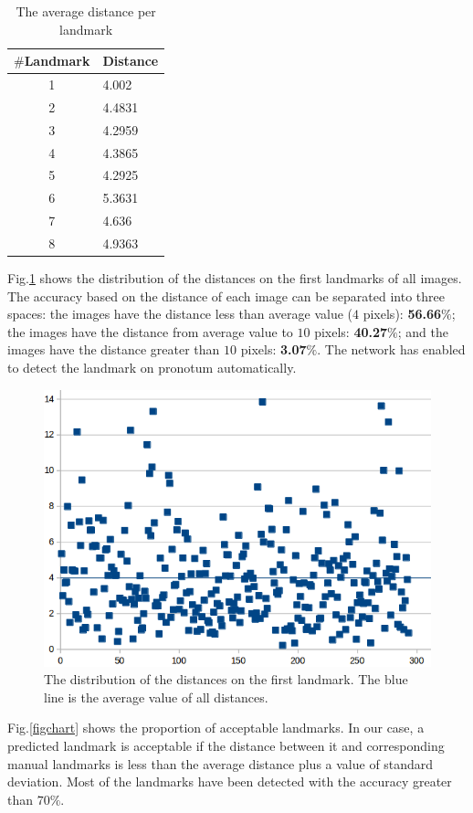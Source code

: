 \documentclass[review]{elsarticle}
\begin{document}
\begin{table}[htbp]
\caption{The average distance per landmark}
\begin{center}
\begin{tabular}{|c|p{1.5cm}|}
\hline
\textbf{$\#$Landmark} & \textbf{Distance} \\ \hline
1 & 4.002  \\ \hline
2 & 4.4831 \\ \hline
3 & 4.2959 \\ \hline
4 & 4.3865 \\ \hline
5 & 4.2925 \\ \hline
6 & 5.3631 \\ \hline
7 & 4.636 \\ \hline
8 & 4.9363 \\ \hline
\end{tabular}
\label{tab2}
\end{center}
\end{table}

Fig.\ref{figchartlm1} shows the distribution of the distances on the first landmarks of all images. The accuracy based on the distance of each image can be separated into three spaces: the images have the distance less than average value ($4$ pixels): \textbf{56.66$\%$}; the images have the distance from average value to $10$ pixels: \textbf{40.27$\%$}; and the images have the distance greater than $10$ pixels: \textbf{3.07$\%$}. The network has enabled to detect the landmark on pronotum automatically. %

\begin{figure}[htbp]
	\centerline{\includegraphics[scale=0.3]{images/statistic}}
	\caption{The distribution of the distances on the first landmark. The blue line is the average value of all distances.}
	\label{figchartlm1}
\end{figure}
Fig.\ref{figchart} shows the proportion of acceptable landmarks. In our case, a predicted landmark is acceptable if the distance between it and corresponding manual landmarks is less than the average distance plus a value of standard deviation. Most of the landmarks have been detected with the accuracy greater than $70\%$. %
\end{document}
